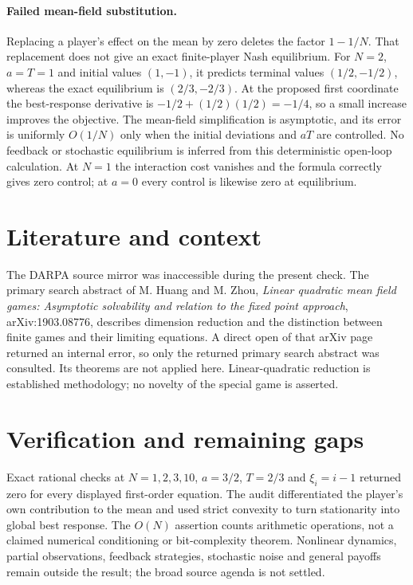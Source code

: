 \documentclass[11pt]{article}
\begin{document}
\paragraph{Failed mean-field substitution.}
Replacing a player's effect on the mean by zero deletes the factor $1-1/N$. That replacement does not give an exact finite-player Nash equilibrium. For $N=2$, $a=T=1$ and initial values $(1,-1)$, it predicts terminal values $(1/2,-1/2)$, whereas the exact equilibrium is $(2/3,-2/3)$. At the proposed first coordinate the best-response derivative is $-1/2+(1/2)(1/2)=-1/4$, so a small increase improves the objective. The mean-field simplification is asymptotic, and its error is uniformly $O(1/N)$ only when the initial deviations and $aT$ are controlled. No feedback or stochastic equilibrium is inferred from this deterministic open-loop calculation. At $N=1$ the interaction cost vanishes and the formula correctly gives zero control; at $a=0$ every control is likewise zero at equilibrium.

\section{Literature and context}
The DARPA source mirror was inaccessible during the present check. The primary search abstract of M. Huang and M. Zhou, \emph{Linear quadratic mean field games: Asymptotic solvability and relation to the fixed point approach}, arXiv:1903.08776, describes dimension reduction and the distinction between finite games and their limiting equations. A direct open of that arXiv page returned an internal error, so only the returned primary search abstract was consulted. Its theorems are not applied here. Linear-quadratic reduction is established methodology; no novelty of the special game is asserted.

\section{Verification and remaining gaps}
Exact rational checks at $N=1,2,3,10$, $a=3/2$, $T=2/3$ and $\xi_i=i-1$ returned zero for every displayed first-order equation. The audit differentiated the player's own contribution to the mean and used strict convexity to turn stationarity into global best response. The $O(N)$ assertion counts arithmetic operations, not a claimed numerical conditioning or bit-complexity theorem. Nonlinear dynamics, partial observations, feedback strategies, stochastic noise and general payoffs remain outside the result; the broad source agenda is not settled.
\end{document}
